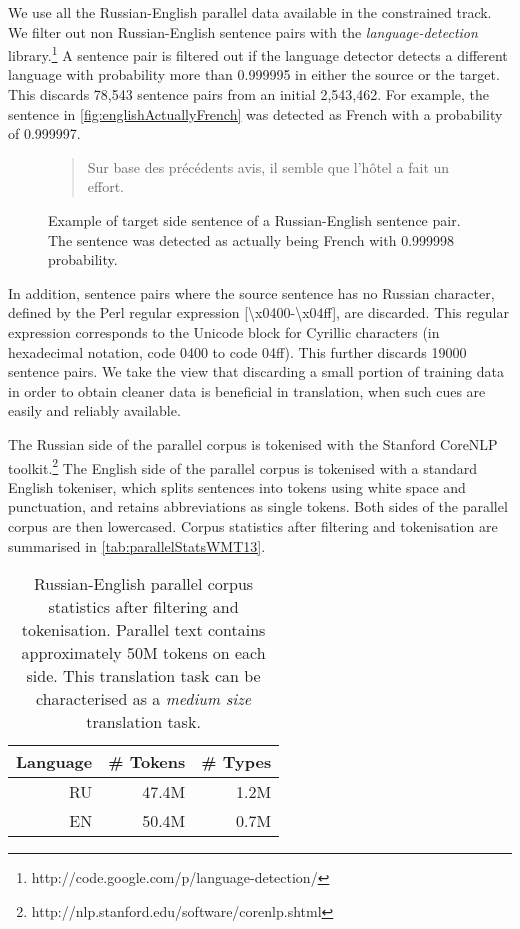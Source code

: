 We use all the Russian-English parallel data available in the constrained track.
We filter out non Russian-English sentence pairs with the
\emph{language-detection} library.\footnote{http://code.google.com/p/language-detection/}
A sentence pair is filtered out if the language detector detects a different language with probability
more than 0.999995 in either the source or the target.
This discards 78,543 sentence pairs from an initial 2,543,462.
For example, the sentence in \autoref{fig:englishActuallyFrench} was detected as French with
a probability of 0.999997.
%
\begin{figure}
\begin{quote}
Sur base des précédents avis, il semble que l'hôtel a fait un effort.
\end{quote}
\caption{Example of target side sentence of a Russian-English sentence pair. The sentence was detected as actually being French with 0.999998 probability.}
\label{fig:englishActuallyFrench}
\end{figure}
%
In addition, sentence pairs where the source sentence has no Russian character, defined by the
Perl regular expression [{\textbackslash}x{0400}-{\textbackslash}x{04ff}], are discarded.
This regular expression corresponds to the Unicode block for Cyrillic
characters (in hexadecimal notation, code 0400 to code 04ff).
This further discards 19000 sentence pairs. We take the view
that discarding a small portion of training data in order to
obtain cleaner data is beneficial in translation, when such cues are easily and
reliably available.

The Russian side of the parallel corpus is tokenised with the
Stanford CoreNLP toolkit.\footnote{http://nlp.stanford.edu/software/corenlp.shtml}
The English side of the parallel corpus is tokenised with a standard English tokeniser,
which splits sentences into tokens using white space and punctuation, and retains
abbreviations as single tokens.
Both sides of the parallel corpus are then lowercased. %
Corpus statistics after filtering and tokenisation are summarised in
\autoref{tab:parallelStatsWMT13}.
%
\begin{table}[htbp]
\begin{center}
\begin{tabular}{*{3}{|r}|}
\hline
Language & \# Tokens & \# Types \\
\hline
\hline
RU & 47.4M & 1.2M \\
\hline
EN & 50.4M & 0.7M \\
\hline
\end{tabular}
\end{center}
\caption{Russian-English parallel corpus statistics after filtering
  and tokenisation.
  Parallel text contains approximately 50M tokens on each side. This translation
  task can be characterised as a \emph{medium size} translation task.}
\label{tab:parallelStatsWMT13}
\end{table}
%

